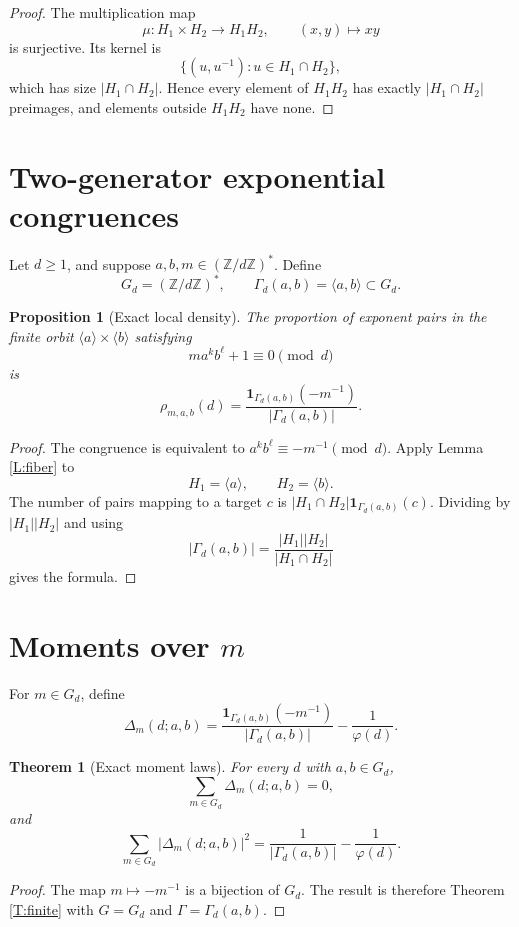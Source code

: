 \documentclass[11pt]{article}
\newtheorem{theorem}{Theorem}
\newtheorem{proposition}{Proposition}
\newcommand{\Z}{\mathbb Z}
\newcommand{\1}{\mathbf 1}
\begin{document}
\begin{proof}
The multiplication map
\[
\mu:H_1\times H_2\to H_1H_2,\qquad (x,y)\mapsto xy
\]
is surjective.  Its kernel is
\[
\{(u,u^{-1}):u\in H_1\cap H_2\},
\]
which has size \(|H_1\cap H_2|\).  Hence every element of \(H_1H_2\) has exactly \(|H_1\cap H_2|\) preimages, and elements outside \(H_1H_2\) have none.
\end{proof}

\section{Two-generator exponential congruences}

Let \(d\ge1\), and suppose \(a,b,m\in(\Z/d\Z)^*\).  Define
\[
G_d=(\Z/d\Z)^*,\qquad \Gamma_d(a,b)=\langle a,b\rangle\subset G_d.
\]

\begin{proposition}[Exact local density]\label{P:localdensity}
The proportion of exponent pairs in the finite orbit \(\langle a\rangle\times\langle b\rangle\) satisfying
\[
m a^k b^\ell+1\equiv0\pmod d
\]
is
\[
\rho_{m,a,b}(d)=
\frac{\1_{\Gamma_d(a,b)}(-m^{-1})}{|\Gamma_d(a,b)|}.
\]
\end{proposition}

\begin{proof}
The congruence is equivalent to \(a^k b^\ell\equiv -m^{-1}\pmod d\).  Apply Lemma \ref{L:fiber} to
\[
H_1=\langle a\rangle,\qquad H_2=\langle b\rangle.
\]
The number of pairs mapping to a target \(c\) is \(|H_1\cap H_2|\1_{\Gamma_d(a,b)}(c)\).  Dividing by \(|H_1||H_2|\) and using
\[
|\Gamma_d(a,b)|=\frac{|H_1||H_2|}{|H_1\cap H_2|}
\]
gives the formula.
\end{proof}

\section{Moments over \(m\)}

For \(m\in G_d\), define
\[
\Delta_m(d;a,b)=
\frac{\1_{\Gamma_d(a,b)}(-m^{-1})}{|\Gamma_d(a,b)|}
-
\frac1{\varphi(d)}.
\]

\begin{theorem}[Exact moment laws]\label{T:moments}
For every \(d\) with \(a,b\in G_d\),
\[
\sum_{m\in G_d}\Delta_m(d;a,b)=0,
\]
and
\[
\sum_{m\in G_d}|\Delta_m(d;a,b)|^2
=
\frac1{|\Gamma_d(a,b)|}-\frac1{\varphi(d)}.
\]
\end{theorem}

\begin{proof}
The map \(m\mapsto -m^{-1}\) is a bijection of \(G_d\).  The result is therefore Theorem \ref{T:finite} with \(G=G_d\) and \(\Gamma=\Gamma_d(a,b)\).
\end{proof}
\end{document}
